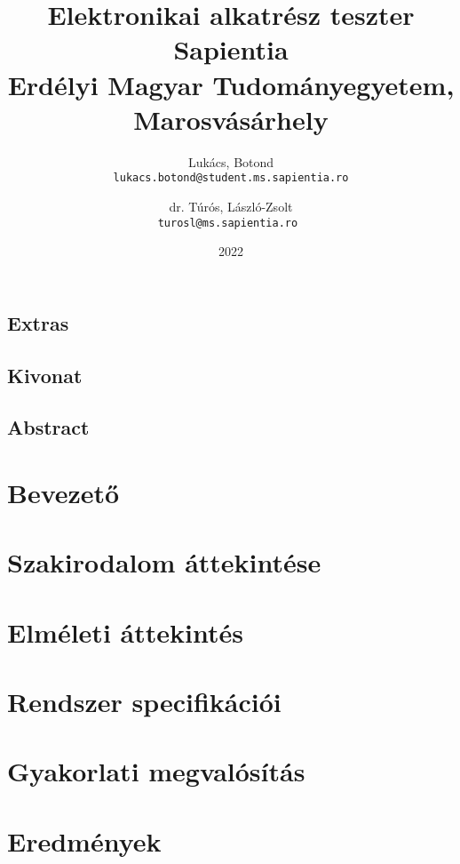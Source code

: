 \documentclass[12pt, twosides]{report}
\title{
	{Elektronikai alkatrész teszter}\\
	{\large Sapientia\\
	Erdélyi Magyar Tudományegyetem, Marosvásárhely}
}
\author{
	Lukács, Botond\\
	\texttt{lukacs.botond@student.ms.sapientia.ro}
	\and
	dr. Túrós, László-Zsolt\\
	\texttt{turosl@ms.sapientia.ro }	
}
\date{2022}
\begin{document}


\section*{Extras}

\pagebreak



\section*{Kivonat}

\pagebreak

\section*{Abstract}

\pagebreak


\tableofcontents

\listoffigures

\chapter{Bevezető}


\chapter{Szakirodalom áttekintése}


\chapter{Elméleti áttekintés}


\chapter{Rendszer specifikációi}


\chapter{Gyakorlati megvalósítás} \label{chpt:implementation}


\chapter{Eredmények}

\end{document}
